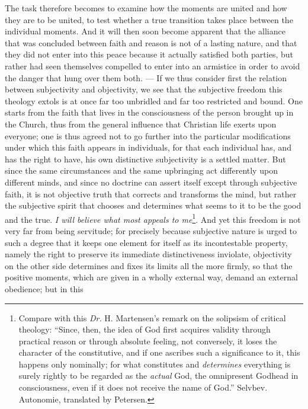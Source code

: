 \documentclass[12pt]{book}
\newcommand{\opage}[1]{\marginnote{\footnotesize\textit{[#1]}}}
\begin{document}
The task therefore becomes to examine how the moments are united and how they
are to be united, to test whether a true transition takes place between the
individual moments. And it will then soon become apparent that the alliance
that was concluded between faith and reason is not of a lasting nature, and
that they did not enter into this peace because it actually satisfied both
parties, but rather had seen themselves compelled to enter into an armistice in
order to avoid the danger that hung over them both. --- If we thus consider
first the relation between subjectivity and objectivity, we see that the
subjective freedom this theology extols is at once far too unbridled and far
too restricted and bound. One starts from the faith that lives in the
consciousness of the person brought up in the Church, thus from the general
influence that Christian life exerts upon everyone; one is thus agreed not to
go further into the particular modifications under which this faith appears in
individuals, for that each individual has, and has the right to have, his own
distinctive subjectivity is a settled matter. But since the same circumstances
and the same upbringing act differently upon different minds, and since no
doctrine can assert itself except through subjective faith, it is not objective
truth that corrects and transforms the mind, but rather the subjective spirit
that chooses and determines what seems to it to be the good and the true.
\emph{I will believe what most appeals
\opage{106} \setcounter{footnote}{0}%
to me}\footnote{Compare with this \textit{Dr.} H. Martensen's remark on the
solipsism of critical theology: ``Since, then, the idea of God first acquires
validity through practical reason or through absolute feeling, not conversely,
it loses the character of the constitutive, and if one ascribes such a
significance to it, this happens only nominally; for what constitutes and
\emph{determines} everything is surely rightly to be regarded as the
\emph{actual} God, the omnipresent Godhead in consciousness, even if it does
not receive the name of God.'' Selvbev. Autonomie, translated by Petersen.}.
And yet this freedom is not very far from being servitude; for precisely
because subjective nature is urged to such a degree that it keeps one element
for itself as its incontestable property, namely the right to preserve its
immediate distinctiveness inviolate, objectivity on the other side determines
and fixes its limits all the more firmly, so that the positive moments, which
are given in a wholly external way, demand an external obedience; but in this
\end{document}
